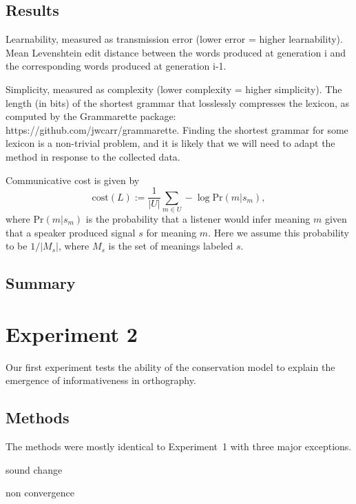 \documentclass[doc,biblatex]{apa7}
\begin{document}
\subsection{Results}

Learnability, measured as transmission error (lower error = higher learnability). Mean Levenshtein edit distance between the words produced at generation i and the corresponding words produced at generation i-1.

Simplicity, measured as complexity (lower complexity = higher simplicity). The length (in bits) of the shortest grammar that losslessly compresses the lexicon, as computed by the Grammarette package: https://github.com/jwcarr/grammarette. Finding the shortest grammar for some lexicon is a non-trivial problem, and it is likely that we will need to adapt the method in response to the collected data.

Communicative cost is given by
\begin{equation}
\mathrm{cost}(L) := \frac{1}{|U|} \sum_{m \in U} -\log \mathrm{Pr}(m|s_m),
\end{equation}
where $\mathrm{Pr}(m|s_m)$ is the probability that a listener would infer meaning $m$ given that a speaker produced signal $s$ for meaning $m$. Here we assume this probability to be $1/|M_s|$, where $M_s$ is the set of meanings labeled $s$.

\subsection{Summary}


\section{Experiment 2}

Our first experiment tests the ability of the conservation model to explain the emergence of informativeness in orthography.

\subsection{Methods}

The methods were mostly identical to Experiment~1 with three major exceptions.

sound change

non convergence
\end{document}
